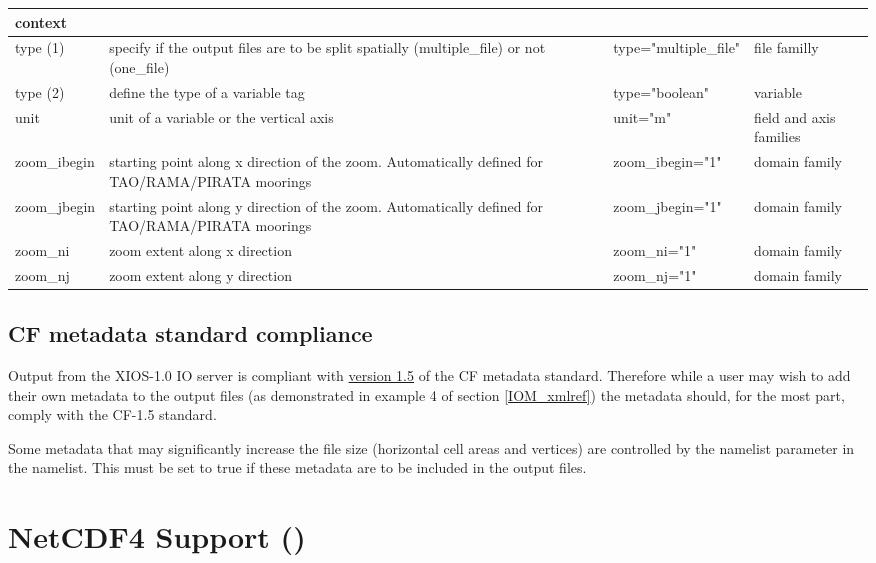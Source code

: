 \documentclass[NEMO_book]{subfiles}
\begin{document}
\begin{longtable}{|p{2.2cm}|p{4cm}|p{3.8cm}|p{2cm}|}
   context \\ 
   \hline   
   type (1)& 
   specify if the output files are to be split spatially (multiple\_file) or not (one\_file) & 
   type="multiple\_file" & 
   file familly \\ 
   \hline   
   type (2)& 
   define the type of a variable tag & 
   type="boolean" & 
   variable \\ 
   \hline   
   unit & 
   unit of a variable or the vertical axis & 
   unit="m" & 
   field and axis families \\ 
   \hline   
   zoom\_ibegin & 
   starting point along x direction of the zoom. Automatically defined for TAO/RAMA/PIRATA moorings & 
   zoom\_ibegin="1" & 
   domain family \\ 
   \hline   
   zoom\_jbegin & 
   starting point along y direction of the zoom. Automatically defined for TAO/RAMA/PIRATA moorings & 
   zoom\_jbegin="1" & 
   domain family \\ 
   \hline   
   zoom\_ni & 
   zoom extent along x direction & 
   zoom\_ni="1" & 
   domain family \\ 
   \hline   
   zoom\_nj & 
   zoom extent along y direction & 
   zoom\_nj="1" & 
   domain family \\ 
   \hline   
\end{longtable}

\subsection{CF metadata standard compliance}

Output from the XIOS-1.0 IO server is compliant with \href{http://cfconventions.org/Data/cf-conventions/cf-conventions-1.5/build/cf-conventions.html}{version 1.5} of the CF metadata standard. Therefore while a user may wish to add their own metadata to the output files (as demonstrated in example 4 of section \ref{IOM_xmlref}) the metadata should, for the most part, comply with the CF-1.5 standard.

Some metadata that may significantly increase the file size (horizontal cell areas and vertices) are controlled by the namelist parameter  in the  namelist. This must be set to true if these metadata are to be included in the output files.


\section{NetCDF4 Support ()}
\label{DIA_iom}
\end{document}

